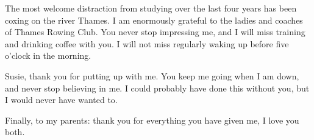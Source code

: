 \begin{singlespace}
The most welcome distraction from studying over the last four years has been
coxing on the river Thames. I am enormously grateful to the ladies and coaches
of Thames Rowing Club. You never stop impressing me, and I will miss training
and drinking coffee with you. I will not miss regularly waking up before five
o'clock in the morning.

Susie, thank you for putting up with me. You keep me going when I am down,
and never stop believing in me. I could probably have done this without you,
but I would never have wanted to.

Finally, to my parents: thank you for everything you have given me, I love you
both.
\end{singlespace}
